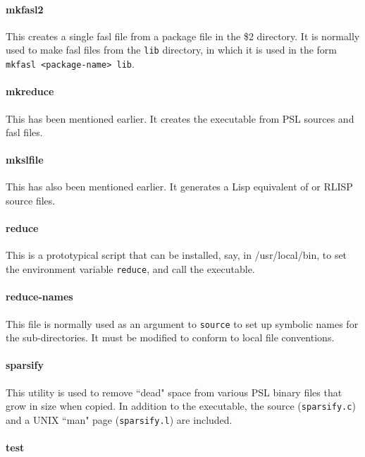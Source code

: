 \paragraph{mkfasl2}

This creates a single fasl file from a package file in the \$2 directory.
It is normally used to make fasl files from the {\tt lib} directory, in
which it is used in the form {\tt mkfasl <package-name> lib}.

\paragraph{mkreduce}

This has been mentioned earlier.  It creates the {\REDUCE} executable from
PSL sources and {\REDUCE} fasl files.

\paragraph{mkslfile}

This has also been mentioned earlier.  It generates a Lisp
equivalent of {\REDUCE} or RLISP source files.

\paragraph{reduce}

This is a prototypical script that can be installed, say, in /usr/local/bin,
to set the environment variable {\tt reduce}, and call the {\REDUCE}
executable.

\paragraph{reduce-names}

This file is normally used as an argument to {\tt source} to set up
symbolic names for the {\REDUCE} sub-directories.  It must be modified to
conform to local file conventions.

\paragraph{sparsify}

This utility is used to remove ``dead" space from various PSL binary files
that grow in size when copied.   In addition to the executable, the source
({\tt sparsify.c}) and a UNIX ``man" page ({\tt sparsify.l}) are included.

\paragraph{test}

